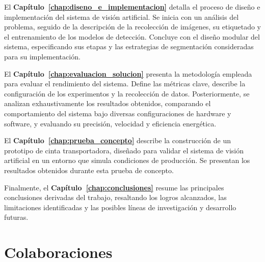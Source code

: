 \documentclass[11pt,spanish,listoffigures,listoftables]{tfgetsinf}
\begin{document}
El \textbf{Capítulo~\ref{chap:diseno_e_implementacion}} detalla el proceso de diseño e implementación del sistema de visión artificial. Se inicia con un análisis del problema, seguido de la descripción de la recolección de imágenes, su etiquetado y el entrenamiento de los modelos de detección. Concluye con el diseño modular del sistema, especificando sus etapas y las estrategias de segmentación consideradas para su implementación.

El \textbf{Capítulo~\ref{chap:evaluacion_solucion}} presenta la metodología empleada para evaluar el rendimiento del sistema. Define las métricas clave, describe la configuración de los experimentos y la recolección de datos. Posteriormente, se analizan exhaustivamente los resultados obtenidos, comparando el comportamiento del sistema bajo diversas configuraciones de hardware y software, y evaluando su precisión, velocidad y eficiencia energética.

El \textbf{Capítulo~\ref{chap:prueba_concepto}} describe la construcción de un prototipo de cinta transportadora, diseñado para validar el sistema de visión artificial en un entorno que simula condiciones de producción. Se presentan los resultados obtenidos durante esta prueba de concepto.

Finalmente, el \textbf{Capítulo~\ref{chap:conclusiones}} resume las principales conclusiones derivadas del trabajo, resaltando los logros alcanzados, las limitaciones identificadas y las posibles líneas de investigación y desarrollo futuras.




\section{Colaboraciones}
\end{document}

